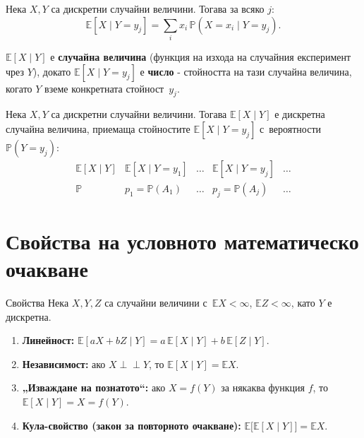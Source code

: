 \begin{defbox}[~(УМО при фиксирано \texorpdfstring{$Y=y_j$}{Y=yj})]
Нека $X,Y$ са дискретни случайни величини. Тогава за всяко $j$:
\[
  \mathbb E[X\mid Y=y_j] = \sum_i x_i\,\mathbb P(X=x_i\mid Y=y_j).
\]
\end{defbox}

\begin{rembox}
$\mathbb E[X\mid Y]$ е \textbf{случайна величина} (функция на
изхода на случайния експеримент чрез $Y$), докато $\mathbb E[X\mid
Y=y_j]$ е \textbf{число} - стойността на тази случайна величина,
когато $Y$ вземе конкретната стойност~$y_j$.
\end{rembox}

\begin{corbox}[]
Нека $X,Y$ са дискретни случайни величини. Тогава $\mathbb E[X\mid
Y]$ е дискретна случайна величина, приемаща стойностите $\mathbb
E[X\mid Y=y_j]$ с~вероятности $\mathbb P(Y=y_j)$:
\[
  \begin{array}{c|cccc}
    \mathbb E[X\mid Y] & \mathbb E[X\mid Y{=}y_1] & \dots & \mathbb E[X\mid Y{=}y_j] & \dots\\\hline
    \mathbb P & p_1=\mathbb P(A_1) & \dots & p_j=\mathbb P(A_j) & \dots
  \end{array}
\]
\end{corbox}

\section{Свойства на условното математическо очакване}

\begin{thmbox}{Свойства}
Нека $X,Y,Z$ са случайни величини с~$\mathbb EX<\infty$,
$\mathbb EZ<\infty$, като $Y$ е дискретна.
\begin{enumerate}[label=\arabic*)]
  \item \textbf{Линейност:} $\mathbb E[aX+bZ\mid Y] = a\,\mathbb E[X\mid Y]+b\,\mathbb E[Z\mid Y]$.
  \item \textbf{Независимост:} ако $X\perp\!\!\!\perp Y$, то $\mathbb E[X\mid Y] = \mathbb EX$.
  \item \textbf{„Изваждане на познатото“:} ако $X=f(Y)$ за някаква функция $f$, то $\mathbb E[X\mid Y]=X=f(Y)$.
  \item \textbf{Кула-свойство (закон за повторното очакване):} $\mathbb E\big[\mathbb E[X\mid Y]\big] = \mathbb EX$.
\end{enumerate}
\end{thmbox}

